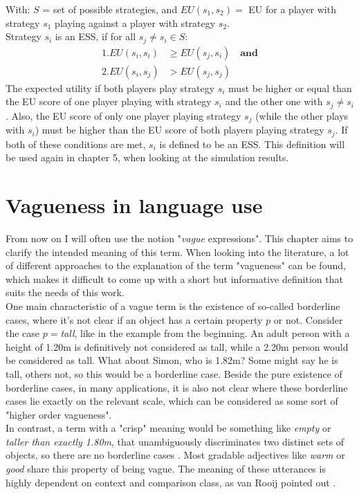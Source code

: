 With: $S$ = set of possible strategies, and $EU(s_1, s_2) = $ EU for a player with strategy $s_1$ playing against a player with strategy $s_2$.\\

Strategy $s_i$ is an ESS, if for all $s_j \neq s_i \in  S$:
\begin{align}
1. EU(s_i, s_i) &\geq EU(s_j, s_i) \quad \textbf{and} \\
2. EU(s_i, s_j) &> EU(s_j, s_j)
\end{align}
The expected utility if both players play strategy $s_i$ must be higher or equal than the EU score of one player playing with strategy $s_i$ and the other one with $s_j \neq s_i$. Also, the EU score of only one player playing strategy $s_j$ (while the other plays with $s_i$) must be higher than the EU score of both players playing strategy $s_j$. If both of these conditions are met, $s_i$ is defined to be an ESS. This definition will be used again in chapter 5, when looking at the simulation results.

\section{Vagueness in language use}
\label{sec:vagueness}

From now on I will often use the notion "\textit{vague} expressions". This chapter aims to clarify the intended meaning of this term. When looking into the literature, a lot of different approaches to the explanation of the term "vagueness" can be found, which makes it difficult to come up with a short but informative definition that suits the needs of this work.\\

One main characteristic of a vague term is the existence of so-called borderline cases, where it's not clear if an object has a certain property $p$ or not. Consider the case $p=$\textit{tall}, like in the example from the beginning. An adult person with a height of 1.20m is definitively not considered as tall, while a 2.20m person would be considered as tall. What about Simon, who is 1.82m? Some might say he is tall, others not, so this would be a borderline case. Beside the pure existence of borderline cases, in many applications, it is also not clear where these borderline cases lie exactly on the relevant scale, which can be considered as some sort of "higher order vagueness".\\

In contrast, a term with a "crisp" meaning would be something like \textit{empty} or \textit{taller than exactly 1.80m}, that unambiguously discriminates two distinct sets of objects, so there are no borderline cases \citep[as in][]{franke2010vagueness}. Most gradable adjectives like \textit{warm} or \textit{good} share this property of being vague. The meaning of these utterances is highly dependent on context and comparison class, as van Rooij pointed out \citep{van2011vagueness}.\\

